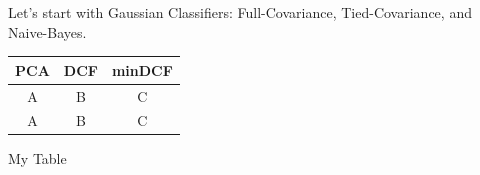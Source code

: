 \documentclass[twocolumn]{article}
\begin{document}
Let's start with Gaussian Classifiers: Full-Covariance, Tied-Covariance, and Naive-Bayes.


    \begin{table}
    \begin{tabular}{||c|c|c||}
        \hline
        PCA & DCF & minDCF \\
        \hline
        \hline
        A & B & C \\
        A & B & C \\
    \end{tabular}
\end{table}
\caption{My Table}



\newpage
\begin{table}



\end{table}

\newpage
\begin{table}



\end{table}
\end{document}
